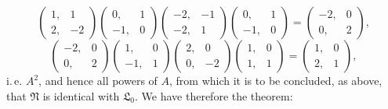 \[
\begin{pmatrix} 1, & 1 \\ 2, & -2 \end{pmatrix}\begin{pmatrix} 0, & 1 \\ -1, & 0 \end{pmatrix}\begin{pmatrix} -2, & -1 \\ -2, & 1 \end{pmatrix}\begin{pmatrix} 0, & 1 \\ -1, & 0 \end{pmatrix} = \begin{pmatrix} -2, & 0 \\ 0, & 2 \end{pmatrix},
\]
\[
\begin{pmatrix} -2, & 0 \\ 0, & 2 \end{pmatrix}\begin{pmatrix} 1, & 0 \\ -1, & 1 \end{pmatrix}\begin{pmatrix} 2, & 0 \\ 0, & -2 \end{pmatrix}\begin{pmatrix} 1, & 0 \\ 1, & 1 \end{pmatrix} = \begin{pmatrix} 1, & 0 \\ 2, & 1 \end{pmatrix},
\]
i.\,e. $A^2$, and hence all powers of $A$, from which it is to be concluded, as above, that $\mathfrak{N}$ is identical with $\mathfrak{L}_0$. We have therefore the theorem:


